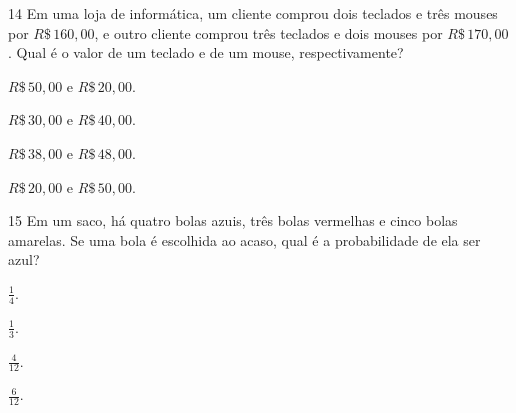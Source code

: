 \num{14} Em uma loja de informática, um cliente comprou dois teclados e três mouses
por $R\$\,160,00$, e outro cliente comprou três teclados e dois mouses por $R\$\,170,00$.
Qual é o valor de um teclado e de um mouse, respectivamente?

\begin{escolha}
\item $R\$\,50,00$ e $R\$\,20,00$.
\item $R\$\,30,00$ e $R\$\,40,00$.
\item $R\$\,38,00$ e $R\$\,48,00$.
\item $R\$\,20,00$ e $R\$\,50,00$.
\end{escolha}



\num{15} Em um saco, há quatro bolas azuis, três bolas vermelhas e cinco bolas amarelas.
Se uma bola é escolhida ao acaso, qual é a probabilidade de ela ser azul?

\begin{escolha}
\item $\frac{1}{4}$.
\item $\frac{1}{3}$.
\item $\frac{4}{12}$.
\item $\frac{6}{12}$.
\end{escolha}

